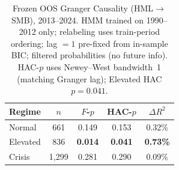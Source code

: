 \documentclass[sigconf,anonymous]{acmart}
\begin{document}
\begin{table}[t]
\centering
\setlength{\tabcolsep}{5pt}
\caption{Frozen OOS Granger Causality (HML$\to$SMB), 2013--2024.
HMM trained on 1990--2012 only; relabeling uses train-period ordering;
lag $= 1$ pre-fixed from in-sample BIC; filtered probabilities (no future info).
HAC-$p$ uses Newey--West bandwidth~1 (matching Granger lag); Elevated HAC $p = 0.041$.}
\label{tab:frozen_granger}
\small
\begin{tabular}{@{}lcccc@{}}
\toprule
Regime & $n$ & $F$-$p$ & HAC-$p$ & $\Delta R^2$ \\
\midrule
Normal    & 661 & 0.149 & 0.153 & 0.32\% \\
Elevated  & 836 & \textbf{0.014} & \textbf{0.041} & \textbf{0.73\%} \\
Crisis    & 1,299 & 0.281 & 0.290 & 0.09\% \\
\bottomrule
\end{tabular}
\end{table}
\end{document}

